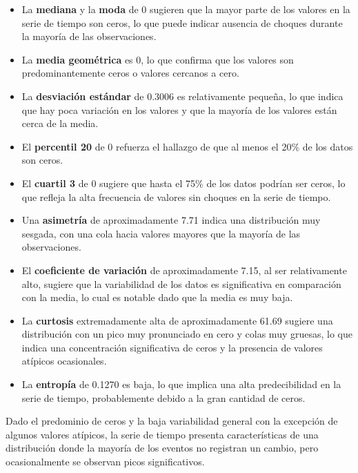 \documentclass[11pt]{article} %
\begin{document}
	 \begin{itemize}
	 	\item La \textbf{mediana} y la \textbf{moda} de 0 sugieren que la mayor parte de los valores en la serie de tiempo son ceros, lo que puede indicar ausencia de choques durante la mayoría de las observaciones.
	 	\item La \textbf{media geométrica} es 0, lo que confirma que los valores son predominantemente ceros o valores cercanos a cero.
	 	\item La \textbf{desviación estándar} de 0.3006 es relativamente pequeña, lo que indica que hay poca variación en los valores y que la mayoría de los valores están cerca de la media.
	 	\item El \textbf{percentil 20} de 0 refuerza el hallazgo de que al menos el 20\% de los datos son ceros.
	 	\item El \textbf{cuartil 3} de 0 sugiere que hasta el 75\% de los datos podrían ser ceros, lo que refleja la alta frecuencia de valores sin choques en la serie de tiempo.
	 	\item Una \textbf{asimetría} de aproximadamente 7.71 indica una distribución muy sesgada, con una cola hacia valores mayores que la mayoría de las observaciones.
	 	\item El \textbf{coeficiente de variación} de aproximadamente 7.15, al ser relativamente alto, sugiere que la variabilidad de los datos es significativa en comparación con la media, lo cual es notable dado que la media es muy baja.
	 	\item La \textbf{curtosis} extremadamente alta de aproximadamente 61.69 sugiere una distribución con un pico muy pronunciado en cero y colas muy gruesas, lo que indica una concentración significativa de ceros y la presencia de valores atípicos ocasionales.
	 	\item La \textbf{entropía} de 0.1270 es baja, lo que implica una alta predecibilidad en la serie de tiempo, probablemente debido a la gran cantidad de ceros.
	 \end{itemize}
	 
	 Dado el predominio de ceros y la baja variabilidad general con la excepción de algunos valores atípicos, la serie de tiempo presenta características de una distribución donde la mayoría de los eventos no registran un cambio, pero ocasionalmente se observan picos significativos.
	 
	 
	 \newpage
\end{document}
